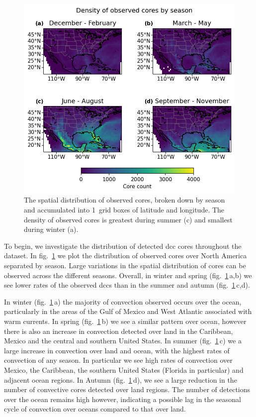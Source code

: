 \begin{figure}[tp]
    \centering
    \includegraphics[width=\textwidth]{figures/ch2_03.png}
    \caption[
    The spatial distribution of observed cores by season
    ]{
    The spatial distribution of observed cores, broken down by season and accumulated into 1\textdegree\ grid boxes of latitude and longitude. The density of observed cores is greatest during summer (c) and smallest during winter (a).
    }
    \label{fig:core_density_by_season}
\end{figure}

To begin, we investigate the distribution of detected \acrshort{dcc} cores throughout the dataset.
In fig.~\ref{fig:core_density_by_season} we plot the distribution of observed cores over North America separated by season.
Large variations in the spatial distribution of cores can be observed across the different seasons.
Overall, in winter and spring (fig.~\ref{fig:core_density_by_season}\,a,b) we see lower rates of the observed \acrshort{dcc}s than in the summer and autumn (fig.~\ref{fig:core_density_by_season}\,c,d).

In winter (fig.~\ref{fig:core_density_by_season}\,a) the majority of convection observed occurs over the ocean, particularly in the areas of the Gulf of Mexico and West Atlantic associated with warm currents.
In spring (fig.~\ref{fig:core_density_by_season}\,b) we see a similar pattern over ocean, however there is also an increase in convection detected over land in the Caribbean, Mexico and the central and southern United States.
In summer (fig.~\ref{fig:core_density_by_season}\,c) we a large increase in convection over land and ocean, with the highest rates of convection of any season.
In particular we see high rates of convection over Mexico, the Caribbean, the southern United States (Florida in particular) and adjacent ocean regions.
In Autumn (fig.~\ref{fig:core_density_by_season}\,d), we see a large reduction in the number of convective cores detected over land regions.
The number of detections over the ocean remains high however, indicating a possible lag in the seasonal cycle of convection over oceans compared to that over land.

